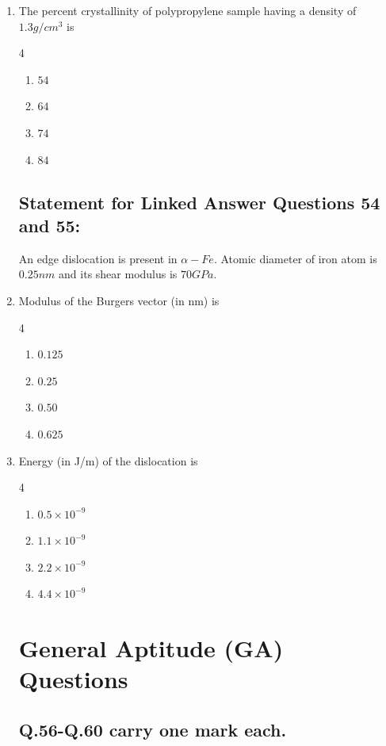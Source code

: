 \documentclass[journal]{IEEEtran}
\theoremstyle{remark}
\begin{document}
\begin{enumerate}
\item   The percent crystallinity of polypropylene sample having a density of $1.3 g/cm^3$  is
\hfill{}

\begin {multicols}{4}
\begin{enumerate}
\item  $54$ 
\item  $64 $
\item $74$
\item  $84 $
\end{enumerate}
\end{multicols}
\subsection*{Statement for Linked Answer Questions 54 and 55: }
An edge dislocation is present in $\alpha-Fe$. Atomic diameter of iron atom is $0.25 nm$ and its shear modulus is $70 GPa$.

\item   Modulus of the Burgers vector (in nm) is
\hfill{}
\begin {multicols}{4}
\begin{enumerate}
\item   $ 0.125 $
\item  $0.25$
\item   $ 0.50 $
\item  $0.625 $
\end{enumerate}
\end{multicols}

\item  Energy (in J/m) of the dislocation is 
\hfill{}

\begin {multicols}{4}
\begin{enumerate}
\item $0.5 \times 10^{-9}$
\item  $1.1 \times 10^{-9}$
\item  $2.2 \times 10^{-9}$
\item  $4.4 \times 10^{-9}$
\end{enumerate}
\end{multicols}
\section{General Aptitude (GA) Questions }
\subsection*{Q.56-Q.60 carry one mark each. }


\end{enumerate}
\end{document}
